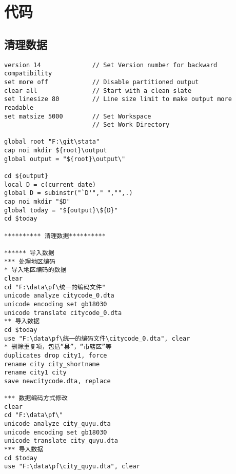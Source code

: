 \section{代码}
\subsection{清理数据}
\begin{lstlisting}[frame=single]
version 14              // Set Version number for backward compatibility
set more off            // Disable partitioned output
clear all               // Start with a clean slate
set linesize 80         // Line size limit to make output more readable
set matsize 5000		// Set Workspace 
						// Set Work Directory

global root "F:\git\stata"
cap noi mkdir ${root}\output
global output = "${root}\output\"

cd ${output}
local D = c(current_date)
global D = subinstr("`D'"," ","",.)
cap noi mkdir "$D"
global today = "${output}\${D}"
cd $today

********** 清理数据**********

****** 导入数据
*** 处理地区编码
* 导入地区编码的数据
clear
cd "F:\data\pf\统一的编码文件"
unicode analyze citycode_0.dta
unicode encoding set gb18030
unicode translate citycode_0.dta
** 导入数据
cd $today
use "F:\data\pf\统一的编码文件\citycode_0.dta", clear
* 删除重复项，包括“县”，“市辖区”等
duplicates drop city1, force
rename city city_shortname
rename city1 city
save newcitycode.dta, replace

*** 数据编码方式修改
clear
cd "F:\data\pf\"
unicode analyze city_quyu.dta
unicode encoding set gb18030
unicode translate city_quyu.dta
*** 导入数据
cd $today
use "F:\data\pf\city_quyu.dta", clear


\end{lstlisting}
